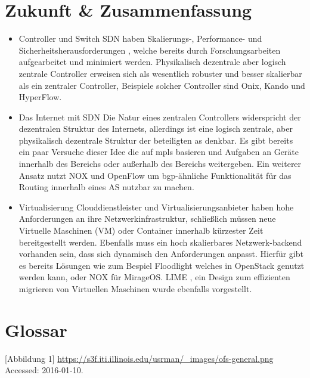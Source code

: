 \documentclass[twoside,12pt]{scrartcl}
\begin{document}
\section{Zukunft \& Zusammenfassung}
\begin{itemize}
	\item Controller und Switch
	SDN haben Skalierungs-, Performance- und Sicherheitsherausforderungen \cite{6739370}, welche bereits durch Forschungsarbeiten aufgearbeitet und minimiert werden. Physikalisch dezentrale aber logisch zentrale Controller erweisen sich als wesentlich robuster und besser skalierbar als ein zentraler Controller, Beispiele solcher Controller sind Onix, Kando und HyperFlow.
	\item Das Internet mit SDN
	Die Natur eines zentralen Controllers widerspricht der dezentralen Struktur des Internets, allerdings ist eine logisch zentrale, aber physikalisch dezentrale Struktur der beteiligten \gls{as} denkbar. Es gibt bereits ein paar Versuche dieser Idee die auf \gls{mpls} basieren und Aufgaben an Geräte innerhalb des Bereichs oder außerhalb des Bereichs weitergeben. Ein weiterer Ansatz nutzt NOX und OpenFlow  um \gls{bgp}-ähnliche Funktionalität für das Routing innerhalb eines AS nutzbar zu machen.
	\item Virtualisierung
	Clouddienstleister und Virtualisierungsanbieter haben hohe Anforderungen an ihre Netzwerkinfrastruktur, schließlich müssen neue Virtuelle Maschinen (VM) oder Container innerhalb kürzester Zeit bereitgestellt werden. Ebenfalls muss ein hoch skalierbares Netzwerk-backend vorhanden sein, dass sich dynamisch den Anforderungen anpasst. Hierfür gibt es bereits Lösungen wie zum Bespiel Floodlight welches in OpenStack genutzt werden kann, oder NOX für MirageOS. LIME \cite{lime}, ein Design zum effizienten migrieren von Virtuellen Maschinen wurde ebenfalls vorgestellt.
\end{itemize}
\newpage
\section{Glossar}
	\listoffigures
	
	\printglossary[style=altlist,title=Glossar]

[Abbildung 1] \url{https://s3f.iti.illinois.edu/usrman/_images/ofs-general.png} Accessed: 2016-01-10.	
	
				
	
	
	
	
\end{document}

